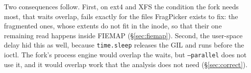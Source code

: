 Two consequences follow. First, on ext4 and XFS the condition the fork needs most,
that waits overlap, fails exactly for the files FragPicker exists to fix: the
fragmented ones, whose extents do not fit in the inode, so that their one remaining
read happens inside FIEMAP (\S\ref{sec:fiemap}). Second, the user-space delay hid this as well,
because \texttt{time.sleep} releases the GIL and runs before the ioctl. The fork's
process engine would overlap the waits, but \texttt{--parallel} does not use it, and it
would overlap work that the analysis does not need (\S\ref{sec:correct}).

